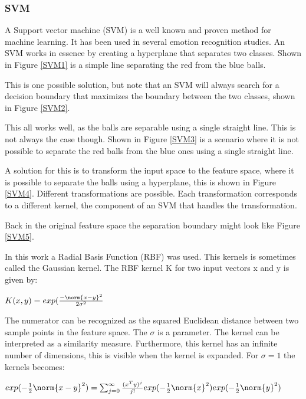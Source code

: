 \clearpage

\subsubsection{SVM}

A Support vector machine (SVM) is a well known and proven method for machine learning. It has been used in several emotion recognition studies. An SVM works in essence by creating a hyperplane that separates two classes. Shown in Figure \ref{SVM1} is a simple line separating the red from the blue balls.


This is one possible solution, but note that an SVM will always search for a decision boundary that maximizes the boundary between the two classes, shown in Figure \ref{SVM2}.


This all works well, as the balls are separable using a single straight line. This is not always the case though. Shown in Figure \ref{SVM3} is a scenario where it is not possible to separate the red balls from the blue ones using a single straight line.


A solution for this is to transform the input space to the feature space, where it is possible to separate the balls using a hyperplane, this is shown in Figure \ref{SVM4}. Different transformations are possible. Each transformation corresponds to a different kernel, the component of an SVM that handles the transformation.


Back in the original feature space the separation boundary might look like Figure \ref{SVM5}.


\label{rbfkernel}
In this work a Radial Basis Function (RBF)  was used. This kernels is sometimes called the Gaussian kernel. The RBF kernel K for two input vectors x and y is given by\citep{RBFKernel}:
\begin{center}
$K(x,y) = exp(\frac{-\norm{x-y}^2}{2\sigma^2}$
\end{center}
The numerator can be recognized as the squared Euclidean distance between two sample points in the feature space. The $\sigma$ is a parameter. The kernel can be interpreted as a similarity measure\citep{RBFSimilarity}. Furthermore, this kernel has an infinite number of dimensions\citep{RBFExpansion}, this is visible when the kernel is expanded. For $\sigma = 1$ the kernels becomes:
\begin{center}
$exp(-\frac{1}{2}\norm{x-y}^2) = \sum_{j=0}^{\infty} \frac{(x^Ty)^j}{j!} exp(-\frac{1}{2}\norm{x}^2)exp(-\frac{1}{2}\norm{y}^2)$
\end{center}

